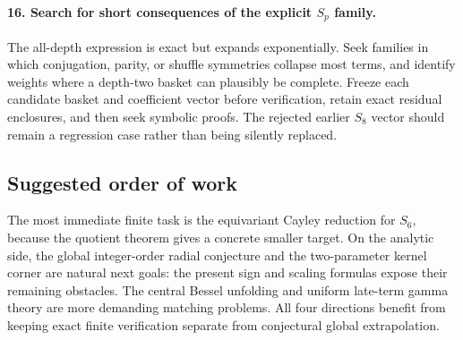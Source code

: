 \paragraph{16. Search for short consequences of the explicit $S_p$ family.}
The all-depth expression is exact but expands exponentially. Seek
families in which conjugation, parity, or shuffle symmetries collapse
most terms, and identify weights where a depth-two basket can plausibly
be complete. Freeze each candidate basket and coefficient vector before
verification, retain exact residual enclosures, and then seek symbolic
proofs. The rejected earlier $S_8$ vector should remain a regression
case rather than being silently replaced.

\subsection{Suggested order of work}
The most immediate finite task is the equivariant Cayley reduction for
$S_6$, because the quotient theorem gives a concrete smaller target.
On the analytic side, the global integer-order radial conjecture and
the two-parameter kernel corner are natural next goals: the present
sign and scaling formulas expose their remaining obstacles. The central
Bessel unfolding and uniform late-term gamma theory are more demanding
matching problems. All four directions benefit from keeping exact
finite verification separate from conjectural global extrapolation.
